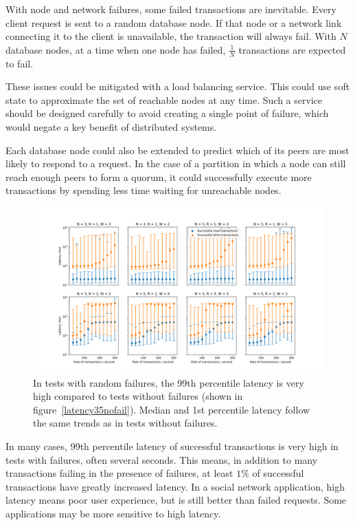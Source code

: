 \documentclass[12pt,a4paper,twoside,openany]{report}
\begin{document}
With node and network failures, some failed transactions are inevitable. Every client request is sent to a random database node. If that node or a network link connecting it to the client is unavailable, the transaction will always fail. With $N$ database nodes, at a time when one node has failed, $\frac{1}{N}$ transactions are expected to fail.

These issues could be mitigated with a load balancing service. This could use soft state to approximate the set of reachable nodes at any time. Such a service should be designed carefully to avoid creating a single point of failure, which would negate a key benefit of distributed systems.

Each database node could also be extended to predict which of its peers are most likely to respond to a request. In the case of a partition in which a node can still reach enough peers to form a quorum, it could successfully execute more transactions by spending less time waiting for unreachable nodes.

\begin{figure}[ht]
\centerline{\includegraphics[width=\paperwidth]{figs/eval-fig-6.png}}
\caption{In tests with random failures, the 99th percentile latency is very high compared to tests without failures (shown in figure~\ref{latency35nofail}). Median and 1st percentile latency follow the same trends as in tests without failures.}
\label{latency35normal}
\end{figure}

In many cases, 99th percentile latency of successful transactions is very high in tests with failures, often several seconds. This means, in addition to many transactions failing in the presence of failures, at least $1\%$ of successful transactions have greatly increased latency. In a social network application, high latency means poor user experience, but is still better than failed requests. Some applications may be more sensitive to high latency.
\end{document}
